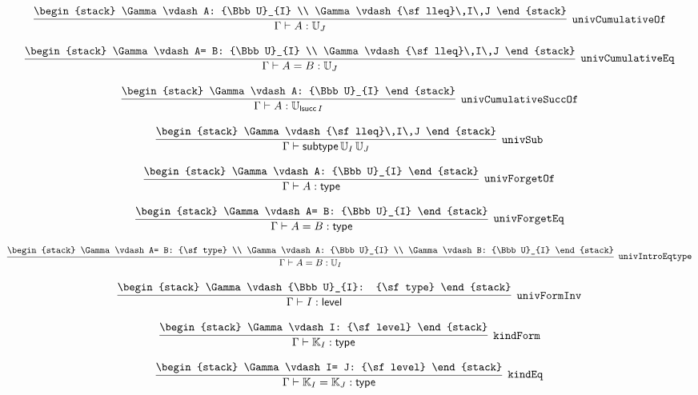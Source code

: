 \[
\infer[{\tt univCumulativeOf}]{\Gamma \vdash A: {\Bbb U}_{J}}{
\begin{stack}
\Gamma \vdash A: {\Bbb U}_{I}
\\
\Gamma \vdash {\sf lleq}\,I\,J
\end{stack}}
\]

\[
\infer[{\tt univCumulativeEq}]{\Gamma \vdash A= B: {\Bbb U}_{J}}{
\begin{stack}
\Gamma \vdash A= B: {\Bbb U}_{I}
\\
\Gamma \vdash {\sf lleq}\,I\,J
\end{stack}}
\]

\[
\infer[{\tt univCumulativeSuccOf}]{\Gamma \vdash A: {\Bbb U}_{{\sf lsucc}\,I}}{
\begin{stack}
\Gamma \vdash A: {\Bbb U}_{I}
\end{stack}}
\]

\[
\infer[{\tt univSub}]{\Gamma \vdash {\sf subtype}\,{\Bbb U}_{I}\,{\Bbb U}_{J}}{
\begin{stack}
\Gamma \vdash {\sf lleq}\,I\,J
\end{stack}}
\]

\[
\infer[{\tt univForgetOf}]{\Gamma \vdash A: {\sf type}}{
\begin{stack}
\Gamma \vdash A: {\Bbb U}_{I}
\end{stack}}
\]

\[
\infer[{\tt univForgetEq}]{\Gamma \vdash A= B: {\sf type}}{
\begin{stack}
\Gamma \vdash A= B: {\Bbb U}_{I}
\end{stack}}
\]

\[
\infer[{\tt univIntroEqtype}]{\Gamma \vdash A= B: {\Bbb U}_{I}}{
\begin{stack}
\Gamma \vdash A= B: {\sf type}
\\
\Gamma \vdash A: {\Bbb U}_{I}
\\
\Gamma \vdash B: {\Bbb U}_{I}
\end{stack}}
\]

\[
\infer[{\tt univFormInv}]{\Gamma \vdash I: {\sf level}}{
\begin{stack}
\Gamma \vdash {\Bbb U}_{I}: {\sf type}
\end{stack}}
\]

\[
\infer[{\tt kindForm}]{\Gamma \vdash {\Bbb K}_{I}: {\sf type}}{
\begin{stack}
\Gamma \vdash I: {\sf level}
\end{stack}}
\]

\[
\infer[{\tt kindEq}]{\Gamma \vdash {\Bbb K}_{I}= {\Bbb K}_{J}: {\sf type}}{
\begin{stack}
\Gamma \vdash I= J: {\sf level}
\end{stack}}
\]

